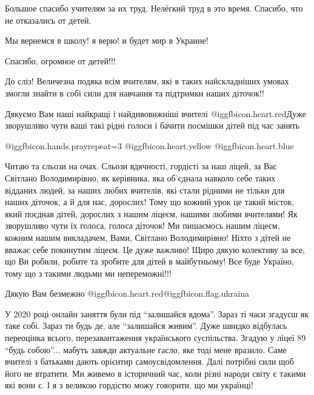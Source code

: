 \begin{itemize}
Большое спасибо учителям за их труд. Нелёгкий труд в это время. Спасибо, что не
отказались от детей.

Мы вернемся в школу! я верю! и будет мир в Украине!

Спасибо, огромное от детей!!!


До сліз! Величезна подяка всім вчителям, які в таких найскладніших умовах
змогли знайти в собі сили для навчання та підтримки наших діточок!!


Дякуємо Вам наші найкращі і найдивовижніші вчителі @igg{fbicon.heart.red}Дуже зворушливо чути ваші
такі рідні голоси і бачити посмішки дітей під час занять

 @igg{fbicon.hands.pray}{repeat=3}  @igg{fbicon.heart.yellow}  @igg{fbicon.heart.blue} 


Читаю та сльози на очах. Сльози вдячності, гордісті за наш ліцей, за Вас
Світлано Володимирівно, як керівника, яка об'єднала навколо себе таких відданих
людей, за наших любих вчителів, які стали рідними не тільки для наших діточок,
а й для нас, дорослих! Тому що кожний урок це такий місток, який поєднав дітей,
дорослих з нашим ліцеєм, нашими любими вчителями! Як зворушливо чути їх голоса,
голоса діточок! Ми пишаємось нашим ліцеєм, кожним нашим викладачем, Вами,
Світлано Володимирівно! Ніхто з дітей не вважає себе покинутим ліцеєм. Це дуже
важливо! Щиро дякую колективу за все, що Ви робили, робите та зробите для дітей
в майбутньому! Все буде Україно, тому що з такими людьми ми непереможні!!!

Дякую Вам безмежно @igg{fbicon.heart.red}@igg{fbicon.flag.ukraina}


У 2020 році онлайн заняття були під \enquote{залишайся вдома}. Зараз ті часи згадуєш як
таке собі. Зараз ти будь де, але \enquote{залишайся живим}. Дуже швидко відбулась
переоцінка всього, перезавантаження українського суспільства. Згадую у ліцеї 89
\enquote{будь собою}... мабуть завжди актуальне гасло, яке тоді мене вразило. Саме
вчителі з батьками дають орієнтир самоусвідомлення. Далі потрібні сили щоб його
не втратити. Ми живемо в історичний час, коли різні народи світу є такими які
вони є. І я з великою гордістю можу говорити, що ми українці!



\end{itemize}
